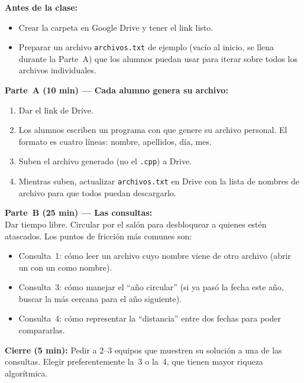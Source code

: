 \documentclass[12pt, oneside]{article}
\begin{document}
\begin{notaprofesor}

  \textbf{Antes de la clase:}
  \begin{itemize}
    \item Crear la carpeta en Google Drive y tener el link listo.
    \item Preparar un archivo \texttt{archivos.txt} de ejemplo (vacío al
          inicio, se llena durante la Parte~A) que los alumnos puedan
          usar para iterar sobre todos los archivos individuales.
  \end{itemize}

  \textbf{Parte~A (10 min) — Cada alumno genera su archivo:}
  \begin{enumerate}
    \item Dar el link de Drive.
    \item Los alumnos escriben un programa con  que genere su
          archivo personal.  El formato es cuatro líneas: nombre, apellidos,
          día, mes.
    \item Suben el archivo generado (no el \texttt{.cpp}) a Drive.
    \item Mientras suben, actualizar \texttt{archivos.txt} en Drive con la
          lista de nombres de archivo para que todos puedan descargarlo.
  \end{enumerate}

  \textbf{Parte~B (25 min) — Las consultas:}\\
  Dar tiempo libre.  Circular por el salón para desbloquear a quienes
  estén atascados.  Los puntos de fricción más comunes son:
  \begin{itemize}
    \item Consulta~1: cómo leer un archivo cuyo nombre viene de otro archivo
          (abrir un  con un  como nombre).
    \item Consulta~3: cómo manejar el ``año circular'' (si ya pasó la fecha
          este año, buscar la más cercana para el año siguiente).
    \item Consulta~4: cómo representar la ``distancia'' entre dos fechas
          para poder compararlas.
  \end{itemize}

  \textbf{Cierre (5 min):}
  Pedir a 2--3 equipos que muestren su solución a una de las consultas.
  Elegir preferentemente la~3 o la~4, que tienen mayor riqueza algorítmica.

\end{notaprofesor}
\end{document}
